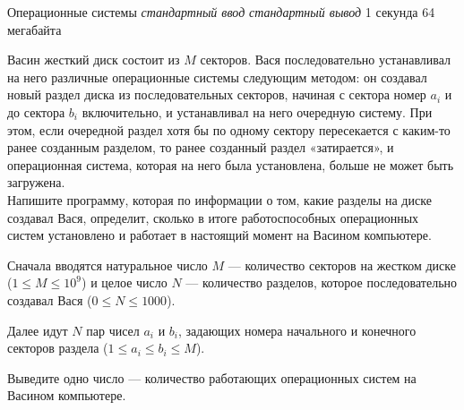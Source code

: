 \begin{problem}%
{Операционные системы}%
{\textsl{стандартный ввод}}%
{\textsl{стандартный вывод}}%
{1 секунда}%
{64 мегабайта}{}

Васин жесткий диск состоит из $M$ секторов. Вася последовательно устанавливал на него различные операционные системы следующим методом: он создавал новый раздел диска из последовательных секторов, начиная с сектора номер $a_i$ и до сектора $b_i$ включительно, и устанавливал на него очередную систему. При этом, если очередной раздел хотя бы по одному сектору пересекается с каким-то ранее созданным разделом, то ранее созданный раздел «затирается», и операционная система, которая на него была установлена, больше не может быть загружена.\\

Напишите программу, которая по информации о том, какие разделы на диске создавал Вася, определит, сколько в итоге работоспособных операционных систем установлено и работает в настоящий момент на Васином компьютере.

\InputFile

Сначала вводятся натуральное число $M$ — количество секторов на жестком диске ($1 \le M \le 10^9$) и целое число $N$ — количество разделов, которое последовательно создавал Вася ($0 \le N \le 1000$).

Далее идут $N$ пар чисел $a_i$ и $b_i$, задающих номера начального и конечного секторов раздела ($1 \le a_i \le b_i \le M$).

\OutputFile

Выведите одно число — количество работающих операционных систем на Васином компьютере.

\Examples

\begin{example}
%
%
\end{example}
\end{problem}